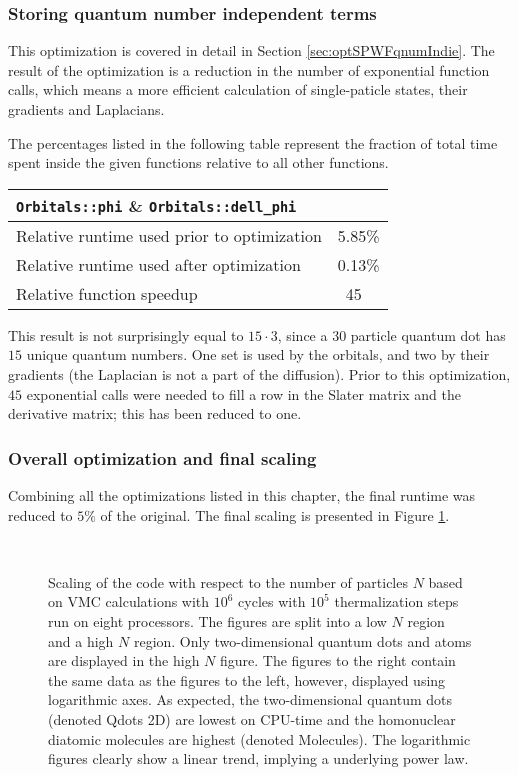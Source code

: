 \subsubsection{Storing quantum number independent terms}

This optimization is covered in detail in Section \ref{sec:optSPWFqnumIndie}. The result of the optimization is a reduction in the number of exponential function calls, which means a more efficient calculation of single-paticle states, their gradients and Laplacians.

The percentages listed in the following table represent the fraction of total time spent inside the given functions relative to all other functions. 

\begin{tabular}{ll}
 \verb+Orbitals::phi+ \& \verb+Orbitals::dell_phi+ & \\
 \hline\hline
 Relative runtime used prior to optimization & 5.85\% \\
 Relative runtime used after optimization    & 0.13\% \\
 \hline
 Relative function speedup                   & ~45
\end{tabular}

This result is not surprisingly equal to $15\cdot 3$, since a $30$ particle quantum dot has $15$ unique quantum numbers. One set is used by the orbitals, and two by their gradients (the Laplacian is not a part of the diffusion). Prior to this optimization, $45$ exponential calls were needed to fill a row in the Slater matrix and the derivative matrix; this has been reduced to one.

\subsubsection{Overall optimization and final scaling}

Combining all the optimizations listed in this chapter, the final runtime was reduced to $5\%$ of the original. The final scaling is presented in Figure \ref{fig:scaling}.

\begin{figure}[h]
 \begin{center}
   \\
  \caption{Scaling of the code with respect to the number of particles $N$ based on VMC calculations with $10^6$ cycles with $10^5$ thermalization steps run on eight processors. The figures are split into a low $N$ region and a high $N$ region. Only two-dimensional quantum dots and atoms are displayed in the high $N$ figure. The figures to the right contain the same data as the figures to the left, however, displayed using logarithmic axes. As expected, the two-dimensional quantum dots (denoted Qdots 2D) are lowest on CPU-time and the homonuclear diatomic molecules are highest (denoted Molecules). The logarithmic figures clearly show a linear trend, implying a underlying power law.}
  \label{fig:scaling}
 \end{center}
\end{figure}

